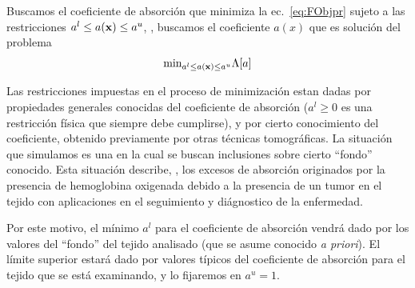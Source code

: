 Buscamos el coeficiente de absorción que minimiza la ec.~\eqref{eq:FObjpr}  
sujeto a las restricciones $a^l \leq a(\mathbf{x}) \leq a^u$, \ie, buscamos 
el coeficiente $a(x)$ que es solución del problema 
\begin{equation}
\begin{split}
\begin{aligned}
\text{min}_{a^l \leq a(\mathbf{x}) \leq a^u} \Lambda[a]
\end{aligned}
\end{split}
\label{eq:minprob}
\end{equation}

Las restricciones impuestas en el proceso de minimización estan dadas 
por propiedades generales conocidas del coeficiente de absorción ($a^l\ge 0$ 
es una restricción física que siempre debe cumplirse), y por cierto conocimiento 
del coeficiente, obtenido previamente por otras técnicas tomográficas. 
La situación que simulamos es una en la cual se buscan inclusiones sobre 
cierto ``fondo'' conocido. Esta situación describe, \eg, los excesos de absorción 
originados por la presencia de hemoglobina oxigenada debido a la presencia de un tumor 
en el tejido con aplicaciones en el seguimiento y diágnostico de la enfermedad. 

Por este motivo, el mínimo $a^l$ para el coeficiente de absorción vendrá dado 
por los valores del ``fondo'' del tejido analisado (que se asume conocido \textit{a priori}). 
El límite superior estará dado por valores típicos del coeficiente de absorción 
para el tejido que se está examinando, y lo fijaremos en $a^u=1$.

